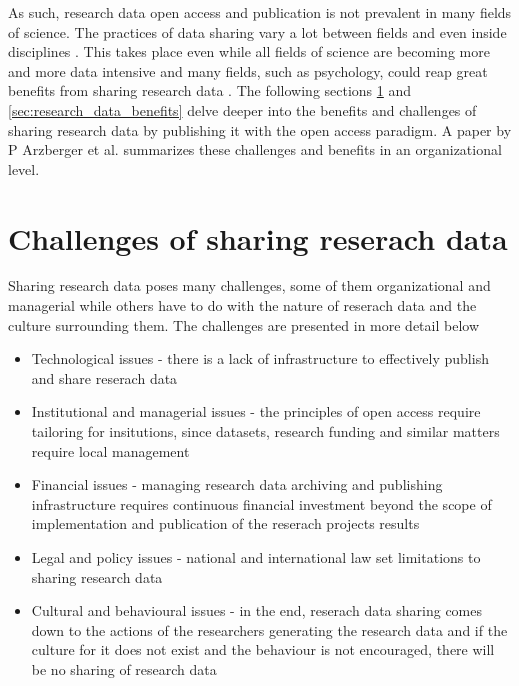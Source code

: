 As such, research data open access and publication is not prevalent in many
fields of science. The practices of data sharing vary a lot between fields and
even inside disciplines \cite{DBLP:journals/jasis/Borgman12}
\cite{cragin2010data}. This takes place even while all fields of science are
becoming more and more data intensive and many fields, such as psychology,
could reap great benefits from sharing research data
\cite{DBLP:books/ms/4paradigm09} \cite{wicherts2006poor}. The following
sections \ref{sec:research_data_challenges} and \ref{sec:research_data_benefits}
delve deeper into the benefits and challenges of sharing research data by
publishing it with the open access paradigm. A paper by P Arzberger et al.
\cite{DBLP:journals/datascience/ArzbergerSBBCLMUW04} summarizes these
challenges and benefits in an organizational level.

\section{Challenges of sharing reserach data}
\label{sec:research_data_challenges}

Sharing research data poses many challenges, some of them organizational and
managerial while others have to do with the nature of reserach data and the
culture surrounding them. The challenges are presented in more detail below
\cite{DBLP:journals/datascience/ArzbergerSBBCLMUW04}
\cite{tenopir2011data}

\begin{itemize}
    \item Technological issues - there is a lack of infrastructure to
          effectively publish and share reserach data
    \item Institutional and managerial issues - the principles of open access
          require tailoring for insitutions, since datasets, research funding
          and similar matters require local management
    \item Financial issues - managing research data archiving and publishing
          infrastructure requires continuous financial investment beyond the
          scope of implementation and publication of the reserach projects
          results
    \item Legal and policy issues - national and international law set
          limitations to sharing research data
    \item Cultural and behavioural issues - in the end, reserach data sharing
          comes down to the actions of the researchers generating the research
          data and if the culture for it does not exist and the behaviour is
          not encouraged, there will be no sharing of research data
\end{itemize}

